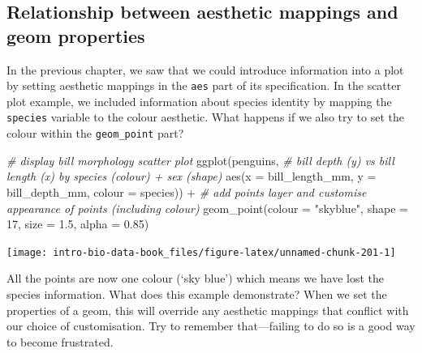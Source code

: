 \documentclass[
]{book}
\newenvironment{Shaded}{\begin{snugshade}}{\end{snugshade}}
\newcommand{\AttributeTok}[1]{\textcolor[rgb]{0.77,0.63,0.00}{#1}}
\newcommand{\CommentTok}[1]{\textcolor[rgb]{0.56,0.35,0.01}{\textit{#1}}}
\newcommand{\DecValTok}[1]{\textcolor[rgb]{0.00,0.00,0.81}{#1}}
\newcommand{\FloatTok}[1]{\textcolor[rgb]{0.00,0.00,0.81}{#1}}
\newcommand{\FunctionTok}[1]{\textcolor[rgb]{0.00,0.00,0.00}{#1}}
\newcommand{\NormalTok}[1]{#1}
\newcommand{\SpecialCharTok}[1]{\textcolor[rgb]{0.00,0.00,0.00}{#1}}
\newcommand{\StringTok}[1]{\textcolor[rgb]{0.31,0.60,0.02}{#1}}
\begin{document}
\hypertarget{relationship-between-aesthetic-mappings-and-geom-properties}{%
\subsection{Relationship between aesthetic mappings and geom properties}\label{relationship-between-aesthetic-mappings-and-geom-properties}}

In the previous chapter, we saw that we could introduce information into a plot by setting aesthetic mappings in the \texttt{aes} part of its specification. In the scatter plot example, we included information about species identity by mapping the \texttt{species} variable to the colour aesthetic. What happens if we also try to set the colour within the \texttt{geom\_point} part?

\begin{Shaded}
\begin{Highlighting}[]
\CommentTok{\# display bill morphology scatter plot}
\FunctionTok{ggplot}\NormalTok{(penguins, }
       \CommentTok{\# bill depth (y) vs bill length (x) by species (colour) + sex (shape)}
       \FunctionTok{aes}\NormalTok{(}\AttributeTok{x =}\NormalTok{ bill\_length\_mm, }\AttributeTok{y =}\NormalTok{ bill\_depth\_mm, }\AttributeTok{colour =}\NormalTok{ species)) }\SpecialCharTok{+} 
  \CommentTok{\# add points layer and customise appearance of points (including colour)}
  \FunctionTok{geom\_point}\NormalTok{(}\AttributeTok{colour =} \StringTok{"skyblue"}\NormalTok{, }\AttributeTok{shape =} \DecValTok{17}\NormalTok{, }\AttributeTok{size =} \FloatTok{1.5}\NormalTok{, }\AttributeTok{alpha =} \FloatTok{0.85}\NormalTok{)}
\end{Highlighting}
\end{Shaded}

\begin{center}\texttt{[image: intro-bio-data-book\_files/figure-latex/unnamed-chunk-201-1]} \end{center}

All the points are now one colour (`sky blue') which means we have lost the species information. What does this example demonstrate? When we set the properties of a geom, this will override any aesthetic mappings that conflict with our choice of customisation. Try to remember that---failing to do so is a good way to become frustrated.
\end{document}
